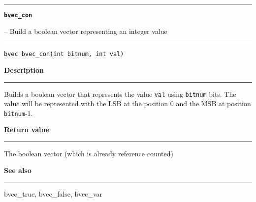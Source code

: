 \begin{minipage}{\textwidth}

\noindent\begin{minipage}{\textwidth}
\rule{\textwidth}{0.5mm}
{\tt\bf bvec\_con }
\--- Build a boolean vector representing an integer value  \hspace{\fill}
\\\rule[1.5ex]{\textwidth}{0.5mm}
\end{minipage}

\noindent\begin{verbatim}
bvec bvec_con(int bitnum, int val) 
\end{verbatim}

\vspace{\parsep}\noindent
{\bf Description}\\\rule[1.5ex]{\textwidth}{0.2mm}\vspace{-1.5ex}\setlength{\parindent}{1em}
Builds a boolean vector that represents the value {\tt val}
           using {\tt bitnum} bits. The value will be represented with the
	   LSB at the position 0 and the MSB at position {\tt bitnum}-1.

\setlength{\parindent}{0em}\vspace{\parsep}\vspace{\baselineskip}\noindent
{\bf Return value}\\\rule[1.5ex]{\textwidth}{0.2mm}\vspace{-1.5ex}
The boolean vector (which is already reference counted) 

\vspace{\parsep}\vspace{\baselineskip}\noindent
{\bf See also}\\\rule[1.5ex]{\textwidth}{0.2mm}\vspace{-1.5ex}
bvec\_true, bvec\_false, bvec\_var 
\end{minipage}
\vspace{8ex}
